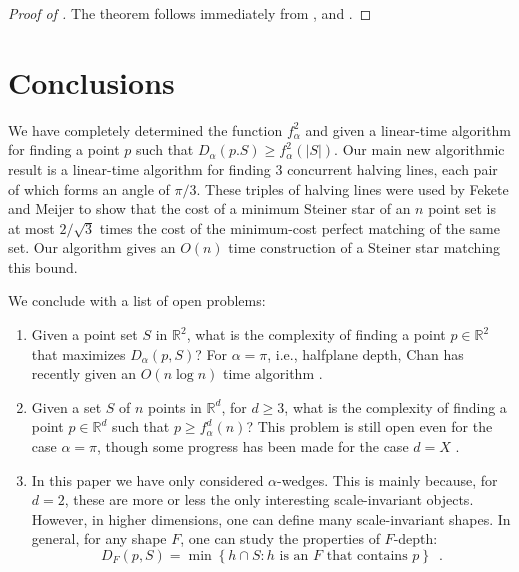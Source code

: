 \documentclass[lotsofwhite]{patmorin}
\begin{document}
\begin{proof}[Proof of ]
The theorem follows immediately from ,
 and .
\end{proof}

\section{Conclusions}

We have completely determined the function $f^2_\alpha$ and given a
linear-time algorithm for finding a point $p$ such that
$D_\alpha(p.S)\ge f^2_\alpha(|S|)$.  Our main new algorithmic result
is a linear-time algorithm for finding 3 concurrent halving lines,
each pair of which forms an angle of $\pi/3$.  These triples of
halving lines were used by Fekete and Meijer to show that the cost of
a minimum Steiner star of an $n$ point set is at most $2/\sqrt{3}$
times the cost of the minimum-cost perfect matching of the same set.
Our algorithm gives an $O(n)$ time construction of a Steiner star
matching this bound.



We conclude with a list of open problems:

\begin{enumerate}
\item Given a point set $S$ in $\mathbb{R}^2$, what is the complexity
of finding a point $p\in\mathbb{R}^2$ that maximizes $D_\alpha(p,S)$?
For $\alpha=\pi$, i.e., halfplane depth, Chan has recently given an
$O(n\log n)$ time algorithm \cite{c04}.

\item Given a set $S$ of $n$ points in $\mathbb{R}^d$, for $d\ge 3$,
what is the complexity of finding a point $p\in \mathbb{R}^d$ such
that $p\ge f_\alpha^d(n)$?  This problem is still open even for the
case $\alpha=\pi$, though some progress has been made for the case
$d=X$ \cite{X}.

\item In this paper we have only considered $\alpha$-wedges.  This is
mainly because, for $d=2$, these are more or less the only interesting
scale-invariant objects.  However, in higher dimensions, one can
define many scale-invariant shapes.  In general, for any shape $F$,
one can study the properties of $F$-depth:
\[
  D_F(p,S) = \min\left\{ 
     h\cap S : \mbox{$h$ is an $F$ that contains $p$}
  \right\} \enspace .
\] 
\end{enumerate}





\end{document}

